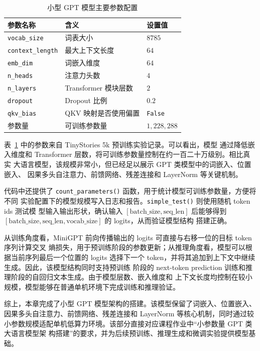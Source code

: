 \documentclass[UTF8,a4paper,zihao=-4,fontset=none]{ctexart}
\numberwithin{equation}{section}
\begin{document}
\begin{table}[!htbp]
  \centering
  \caption{小型 GPT 模型主要参数配置}
  \label{tab:minigpt_config}
  \renewcommand{\arraystretch}{1.2}
  \begin{tabular}{lll}
    \toprule
    参数名称 & 含义 & 设置值 \\
    \midrule
    \texttt{vocab\_size} & 词表大小 & $8785$ \\
    \texttt{context\_length} & 最大上下文长度 & $64$ \\
    \texttt{emb\_dim} & 词嵌入维度 & $64$ \\
    \texttt{n\_heads} & 注意力头数 & $4$ \\
    \texttt{n\_layers} & Transformer 模块层数 & $2$ \\
    \texttt{dropout} & Dropout 比例 & $0.2$ \\
    \texttt{qkv\_bias} & QKV 映射是否使用偏置 & \texttt{False} \\
    参数量 & 可训练参数量 & $1,228,288$ \\
    \bottomrule
  \end{tabular}
\end{table}

表~\ref{tab:minigpt_config} 中的参数来自 TinyStories 5k 预训练实验记录。可以看出，模型
通过降低嵌入维度和 Transformer 层数，将可训练参数量控制在约一百二十万级别。相比真实
大语言模型，该规模非常小，但已经足以展示 GPT 类模型中的词嵌入、位置嵌入、
因果多头自注意力、前馈网络、残差连接和 LayerNorm 等关键机制。

代码中还提供了 \texttt{count\_parameters()} 函数，用于统计模型可训练参数量，方便将不同
实验配置下的模型规模写入日志和报告。\texttt{simple\_test()} 则使用随机 token ids 测试模
型输入输出形状，确认输入 $[\mathrm{batch\_size},\mathrm{seq\_len}]$ 后能够得到
$[\mathrm{batch\_size},\mathrm{seq\_len},\mathrm{vocab\_size}]$ 的 logits，从而验证模型结构
搭建正确。

从训练角度看，MiniGPT 前向传播输出的 logits 可直接与右移一位的目标 token 序列计算交叉
熵损失，用于预训练阶段的参数更新；从推理角度看，模型可以根据当前序列最后一个位置的
logits 选择下一个 token，并将其追加到上下文中继续生成。因此，该模型结构同时支持预训练
阶段的 next-token prediction 训练和推理阶段的自回归文本生成。由于模型层数、嵌入维度和
上下文长度均控制在较小规模，模型能够在普通单机环境下完成训练和推理验证。

综上，本章完成了小型 GPT 模型架构的搭建。该模型保留了词嵌入、位置嵌入、
因果多头自注意力、前馈网络、残差连接和 LayerNorm 等核心机制，同时通过较
小参数规模适配单机低算力环境。该部分直接对应课程作业中“小参数量 GPT 类大语言模型架
构搭建”的要求，并为后续预训练、推理生成和微调实验提供模型基础。
\end{document}
